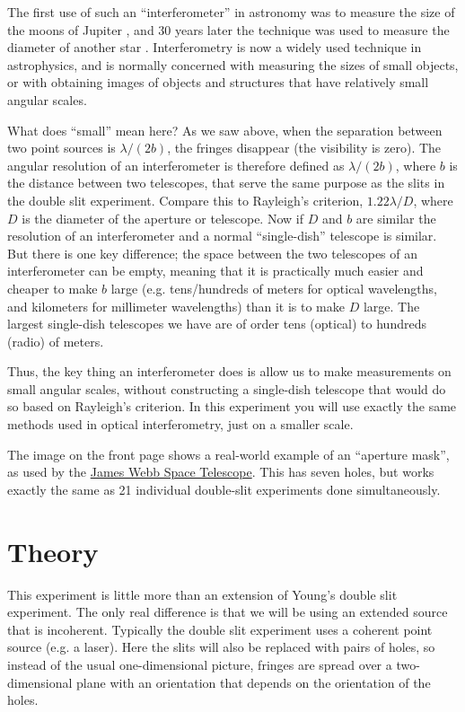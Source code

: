 \documentclass[11pt]{article}
\begin{document}
The first use of such an ``interferometer'' in astronomy was to measure the size of the moons of Jupiter \citep{1891PASP....3..274M,1891Natur..45..160M}, and 30 years later the technique was used to measure the diameter of another star \citep{1921ApJ....53..249M}. Interferometry is now a widely used technique in astrophysics, and is normally concerned with measuring the sizes of small objects, or with obtaining images of objects and structures that have relatively small angular scales.

What does ``small'' mean here? As we saw above, when the separation between two point sources is $\lambda/(2b)$, the fringes disappear (the visibility is zero). The angular resolution of an interferometer is therefore defined as $\lambda/(2b)$, where $b$ is the distance between two telescopes, that serve the same purpose as the slits in the double slit experiment. Compare this to Rayleigh's criterion, $1.22 \lambda/D$, where $D$ is the diameter of the aperture or telescope. Now if $D$ and $b$ are similar the resolution of an interferometer and a normal ``single-dish'' telescope is similar. But there is one key difference; the space between the two telescopes of an interferometer can be empty, meaning that it is practically much easier and cheaper to make $b$ large (e.g. tens/hundreds of meters for optical wavelengths, and kilometers for millimeter wavelengths) than it is to make $D$ large. The largest single-dish telescopes we have are of order tens (optical) to hundreds (radio) of meters.

Thus, the key thing an interferometer does is allow us to make measurements on small angular scales, without constructing a single-dish telescope that would do so based on Rayleigh's criterion. In this experiment you will use exactly the same methods used in optical interferometry, just on a smaller scale.

The image on the front page shows a real-world example of an ``aperture mask'', as used by the \href{https://jwst-docs.stsci.edu/jwst-near-infrared-imager-and-slitless-spectrograph/niriss-observing-modes/niriss-aperture-masking-interferometry}{James Webb Space Telescope}. This has seven holes, but works exactly the same as 21 individual double-slit experiments done simultaneously.

\clearpage
\section{Theory}

This experiment is little more than an extension of Young's double slit experiment. The only real difference is that we will be using an extended source that is incoherent. Typically the double slit experiment uses a coherent point source (e.g. a laser). Here the slits will also be replaced with pairs of holes, so instead of the usual one-dimensional picture, fringes are spread over a two-dimensional plane with an orientation that depends on the orientation of the holes. 
\end{document}

